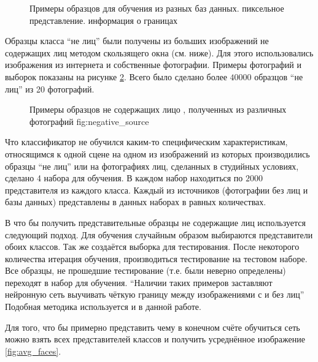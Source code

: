 \documentclass[12pt]{report}
\begin{document}
\begin{figure}[h]
	\centering
	\caption{Примеры образцов для обучения из разных баз данных.  пиксельное представление. 
 информация о границах}
	\label{fig:sample_faces}
\end{figure}

Образцы класса ``не лиц'' были получены из больших изображений не содержащих лиц методом скользящего окна (см. 
ниже). 
Для этого использовались изображения из интернета и собственные фотографии. Примеры фотографий и выборок показаны 
на 
рисунке \ref{fig:sample_nonfaces}. Всего было сделано более $40 000$ образцов ``не лиц'' из 20 фотографий.

\begin{figure}[h]
	\centering
	\caption{Примеры образцов не содержащих лицо , полученных из различных фотографий \subref
{fig:negative_source}}
	\label{fig:sample_nonfaces}
\end{figure}

Что классификатор не обучился каким-то специфическим характеристикам, относящимся к одной сцене на одном из 
изображений из которых производились образцы ``не лиц'' или на фотографиях лиц, сделанных в студийных условиях, 
сделано 4 набора для обучения. В каждом набор находиться по $2 000$ представителя из каждого класса. Каждый из 
источников (фотографии без лиц и базы данных) представлены в данных наборах в равных количествах.

В \citep{rowley1998neural} что бы получить представительные образцы не содержащие лиц используется следующий 
подход. 
Для обучения случайным образом выбираются представители обоих классов. Так же создаётся выборка для тестирования. 
После некоторого количества итерация обучения, производиться тестирование на тестовом наборе. Все образцы, не 
прошедшие тестирование (т.е. были неверно определены) переходят в набор для обучения. ``Наличии таких примеров 
заставляют нейронную сеть выучивать чёткую границу между изображениями с и без лиц'' \citep{rowley1998neural} 
Подобная методика используется и в данной работе.

Для того, что бы примерно представить чему в конечном счёте обучиться сеть можно взять всех представителей классов 
и 
получить усреднённое изображение \ref{fig:avg_faces}.
\end{document}
